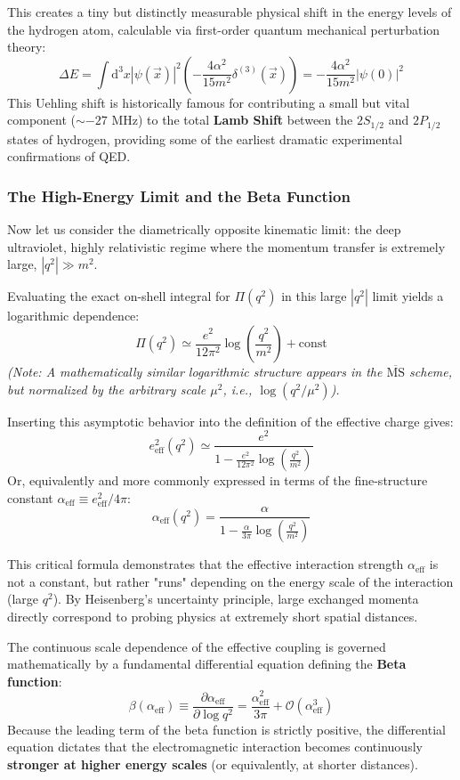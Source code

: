 This creates a tiny but distinctly measurable physical shift in the energy levels of the hydrogen atom, calculable via first-order quantum mechanical perturbation theory:
\[ \Delta E = \int \mathrm{d}^3 x |\psi(\vec{x})|^2 \left( -\frac{4\alpha^2}{15 m^2} \delta^{(3)}(\vec{x}) \right) = -\frac{4\alpha^2}{15 m^2} |\psi(0)|^2 \]
This Uehling shift is historically famous for contributing a small but vital component ($\sim -27$ MHz) to the total \textbf{Lamb Shift} between the $2S_{1/2}$ and $2P_{1/2}$ states of hydrogen, providing some of the earliest dramatic experimental confirmations of QED.

\subsubsection{The High-Energy Limit and the Beta Function}
Now let us consider the diametrically opposite kinematic limit: the deep ultraviolet, highly relativistic regime where the momentum transfer is extremely large, $|q^2| \gg m^2$.

Evaluating the exact on-shell integral for $\Pi(q^2)$ in this large $|q^2|$ limit yields a logarithmic dependence:
\[ \Pi(q^2) \simeq \frac{e^2}{12\pi^2} \log\left(\frac{q^2}{m^2}\right) + \text{const} \]
\textit{(Note: A mathematically similar logarithmic structure appears in the $\overline{\text{MS}}$ scheme, but normalized by the arbitrary scale $\mu^2$, i.e., $\log(q^2/\mu^2)$).}

Inserting this asymptotic behavior into the definition of the effective charge gives:
\[ e_{\text{eff}}^2(q^2) \simeq \frac{e^2}{1 - \frac{e^2}{12\pi^2} \log\left(\frac{q^2}{m^2}\right)} \]
Or, equivalently and more commonly expressed in terms of the fine-structure constant $\alpha_{\text{eff}} \equiv e_{\text{eff}}^2 / 4\pi$:
\[ \alpha_{\text{eff}}(q^2) = \frac{\alpha}{1 - \frac{\alpha}{3\pi} \log\left(\frac{q^2}{m^2}\right)} \]

This critical formula demonstrates that the effective interaction strength $\alpha_{\text{eff}}$ is not a constant, but rather "runs" depending on the energy scale of the interaction (large $q^2$). By Heisenberg's uncertainty principle, large exchanged momenta directly correspond to probing physics at extremely short spatial distances.

The continuous scale dependence of the effective coupling is governed mathematically by a fundamental differential equation defining the \textbf{Beta function}:
\[ \beta(\alpha_{\text{eff}}) \equiv \frac{\partial \alpha_{\text{eff}}}{\partial \log q^2} = \frac{\alpha_{\text{eff}}^2}{3\pi} + \mathcal{O}(\alpha_{\text{eff}}^3) \]
Because the leading term of the beta function is strictly positive, the differential equation dictates that the electromagnetic interaction becomes continuously \textbf{stronger at higher energy scales} (or equivalently, at shorter distances).

